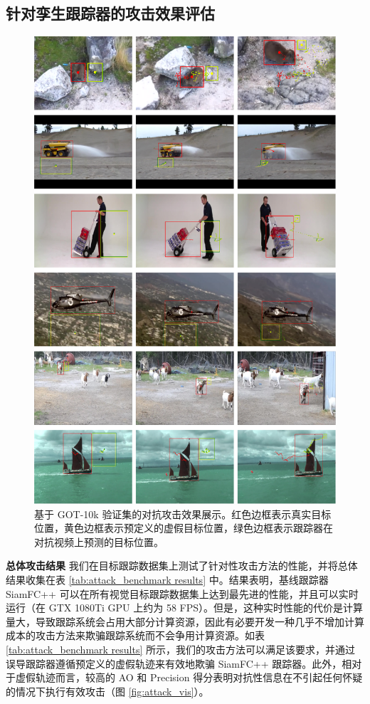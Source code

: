 \subsection{针对孪生跟踪器的攻击效果评估}
\begin{figure}[p]
\centering
\includegraphics[width=1.0\textwidth]{Img/attack/txt_visualize.pdf}
\caption{基于 GOT-10k \cite{GOT-10k} 验证集的对抗攻击效果展示。红色边框表示真实目标位置，黄色边框表示预定义的虚假目标位置，绿色边框表示跟踪器在对抗视频上预测的目标位置。}
\end{figure}

\textbf{总体攻击结果} 我们在目标跟踪数据集上测试了针对性攻击方法的性能，并将总体结果收集在表 \ref{tab:attack_benchmark results} 中。结果表明，基线跟踪器 SiamFC++ 可以在所有视觉目标跟踪数据集上达到最先进的性能，并且可以实时运行（在 GTX 1080Ti GPU 上约为 58 FPS）。但是，这种实时性能的代价是计算量大，导致跟踪系统会占用大部分计算资源，因此有必要开发一种几乎不增加计算成本的攻击方法来欺骗跟踪系统而不会争用计算资源。如表 \ref{tab:attack_benchmark results} 所示，我们的攻击方法可以满足该要求，并通过误导跟踪器遵循预定义的虚假轨迹来有效地欺骗 SiamFC++ 跟踪器。此外，相对于虚假轨迹而言，较高的 AO 和 Precision 得分表明对抗性信息在不引起任何怀疑的情况下执行有效攻击（图 \ref{fig:attack_vis}）。


